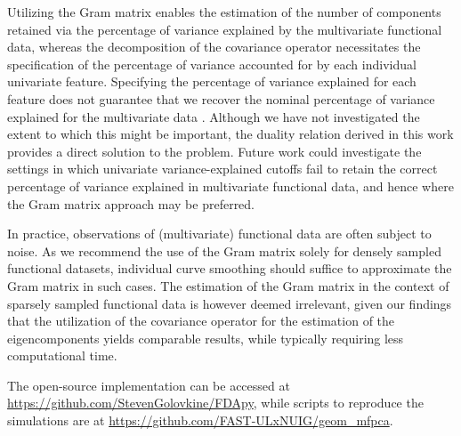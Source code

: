 Utilizing the Gram matrix enables the estimation of the number of components retained via the percentage of variance explained by the multivariate functional data, whereas the decomposition of the covariance operator necessitates the specification of the percentage of variance accounted for by each individual univariate feature. Specifying the percentage of variance explained for each feature does not guarantee that we recover the nominal percentage of variance explained for the multivariate data \citep{golovkineEstimationNumberComponents2023}. Although we have not investigated the extent to which this might be important, the duality relation derived in this work provides a direct solution to the problem. Future work could investigate the settings in which univariate variance-explained cutoffs fail to retain the correct percentage of variance explained in multivariate functional data, and hence where the Gram matrix approach may be preferred.

In practice, observations of (multivariate) functional data are often subject to noise. As we recommend the use of the Gram matrix solely for densely sampled functional datasets, individual curve smoothing should suffice to approximate the Gram matrix in such cases. The estimation of the Gram matrix in the context of sparsely sampled functional data is however deemed irrelevant, given our findings that the utilization of the covariance operator for the estimation of the eigencomponents yields comparable results, while typically requiring less computational time.

The open-source implementation can be accessed at \url{https://github.com/StevenGolovkine/FDApy}, while scripts to reproduce the simulations are at \url{https://github.com/FAST-ULxNUIG/geom_mfpca}.


